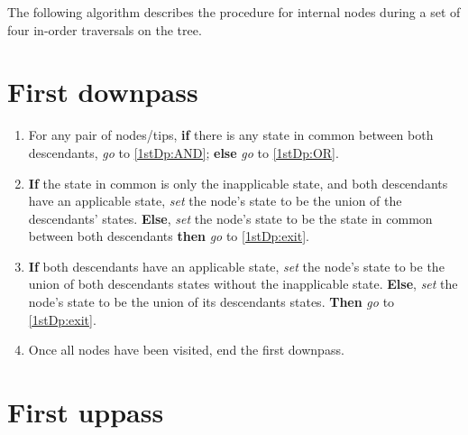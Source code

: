 \documentclass[a4paper,12pt]{article}
\begin{document}

\noindent The following algorithm describes the procedure for internal nodes during a set of four in-order traversals on the tree. 

\section{First downpass} \label{1stDp}

\begin{enumerate}
    \item \label{1stDp:enter} For any pair of nodes/tips, \textbf{if} there is any state in common between both descendants, \textit{go} to \ref{1stDp:AND}; \textbf{else} \textit{go} to \ref{1stDp:OR}.
    \item \label{1stDp:AND} \textbf{If} the state in common is only the inapplicable state, and both descendants have an applicable state, \textit{set} the node's state to be the union of the descendants' states. \textbf{Else}, \textit{set} the node's state to be the state in common between both descendants \textbf{then} \textit{go} to \ref{1stDp:exit}.
    \item \label{1stDp:OR}  \textbf{If} both descendants have an applicable state, \textit{set} the node's state to be the union of both descendants states without the inapplicable state. \textbf{Else}, \textit{set} the node's state to be the union of its descendants states. \textbf{Then} \textit{go} to \ref{1stDp:exit}.
    \item \label{1stDp:exit} Once all nodes have been visited, end the first downpass.
\end{enumerate}


\section{First uppass} \label{1stUp}
\end{document}
